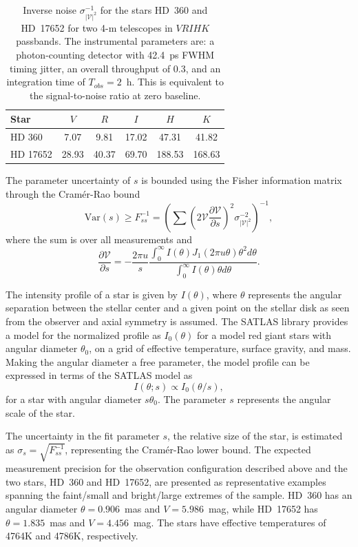 \documentclass[linenumbers,trackchanges,margins]{aastex701}
\begin{document}
\begin{table}
\begin{tabular}{lccccc}
\hline
Star & $V$ & $R$ & $I$ & $H$ & $K$ \\
\hline
HD 360 & 7.07 & 9.81 & 17.02 & 47.31 & 41.82 \\
HD 17652 & 28.93 & 40.37 & 69.70 & 188.53 & 168.63 \\
\hline
\end{tabular}
\caption{Inverse noise $\sigma^{-1}_{|\mathcal{V}|^2}$  for the stars HD~360 and HD~17652 for two
4-m telescopes in $VRIHK$ passbands.
The instrumental parameters are: a photon-counting detector with 42.4~ps FWHM timing jitter,
an overall throughput of 0.3, and an integration time of $T_{obs}=2$~h.  This is equivalent to the signal-to-noise ratio at zero baseline. }\label{tab:inverse_noise}
\end{table}


The parameter uncertainty of $s$ is bounded using the Fisher information matrix through the Cram\'er-Rao bound
\begin{equation}
\text{Var}(s) \ge F_{ss}^{-1} =   \left(\sum \left(2 \mathcal{V}\frac{\partial \mathcal{V}}{\partial s}  \right)^2 \sigma_{|\mathcal{V}|^2}^{-2} \right)^{-1},
\end{equation}
where the sum is over all measurements and
\begin{equation}
    \frac{\partial \mathcal{V}}{\partial s} = -\frac{2\pi u}{s}
     \frac{ \int_0^\infty{I(\theta) J_1(2 \pi u\theta) \theta^2 d\theta}}
    {\int_0^\infty{I(\theta)\theta d\theta}}.
\end{equation}


The intensity profile of a star is given by $I(\theta)$, where
$\theta$ represents the angular separation between the stellar center and a given point on the stellar disk as seen from the observer and axial symmetry is assumed.
The SATLAS
library provides a model for the normalized profile as $I_0(\theta)$ for
a model red giant stars with angular diameter
$\theta_0$, on a grid of effective temperature, surface gravity, and mass.
Making the angular diameter a free parameter,
the model profile can be expressed in terms of the SATLAS model as
\begin{equation}
    I(\theta; s) \propto I_0(\theta/s),
\end{equation}
for a star with angular diameter $s\theta_0$.  The
parameter $s$ represents the angular scale of the star.

The uncertainty in the fit parameter $s$, the relative size of the star, is estimated 
as $\sigma_s = \sqrt{F_{ss}^{-1}}$, representing the Cram\'er-Rao lower bound.
The expected measurement precision for the observation configuration described above
and the two stars, HD~360 and HD~17652, are presented as representative examples spanning the faint/small and bright/large extremes of the sample. HD~360 has an angular diameter $\theta = 0.906$~mas and $V = 5.986$~mag, while HD~17652 has $\theta = 1.835$~mas and $V = 4.456$~mag. The stars have effective temperatures of 4764K and 4786K, respectively.
\end{document}
